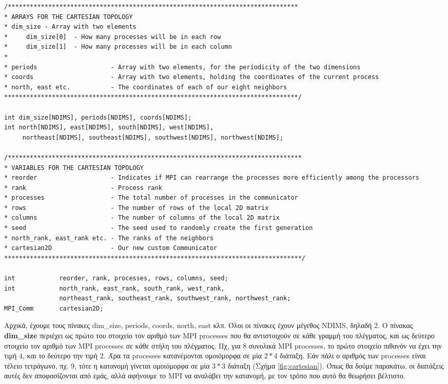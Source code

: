 \begin{tcolorbox}
\begin{verbatim}
/*******************************************************************************
* ARRAYS FOR THE CARTESIAN TOPOLOGY
* dim_size - Array with two elements
*     dim_size[0]  - How many processes will be in each row
*     dim_size[1]  - How many processes will be in each column
*
* periods                    - Array with two elements, for the periodicity of the two dimensions
* coords                     - Array with two elements, holding the coordinates of the current process
* north, east etc.           - The coordinates of each of our eight neighbors
********************************************************************************/

int dim_size[NDIMS], periods[NDIMS], coords[NDIMS];
int north[NDIMS], east[NDIMS], south[NDIMS], west[NDIMS],
     northeast[NDIMS], southeast[NDIMS], southwest[NDIMS], northwest[NDIMS];

/********************************************************************************
* VARIABLES FOR THE CARTESIAN TOPOLOGY
* reorder                    - Indicates if MPI can rearrange the processes more efficiently among the processors
* rank                       - Process rank
* processes                  - The total number of processes in the communicator
* rows                       - The number of rows of the local 2D matrix
* columns                    - The number of columns of the local 2D matrix
* seed                       - The seed used to randomly create the first generation
* north_rank, east_rank etc. - The ranks of the neighbors
* cartesian2D                - Our new custom Communicator
*********************************************************************************/

int            reorder, rank, processes, rows, columns, seed;
int            north_rank, east_rank, south_rank, west_rank,
               northeast_rank, southeast_rank, southwest_rank, northwest_rank;
MPI_Comm       cartesian2D;
\end{verbatim}
\end{tcolorbox}

\begin{multicols}{2}
Αρχικά, έχουμε τους πίνακες dim\_size, periods, coords, north, east κλπ. Όλοι οι πίνακες έχουν μέγεθος NDIMS, δηλαδή $2$. Ο πίνακας \textbf{dim\_size } περιέχει ως πρώτο του στοιχείο τον αριθμό των MPI processes που θα αντιστοιχούν σε κάθε γραμμή του πλέγματος, και ως δεύτερο στοιχείο τον αριθμό των MPI processes σε κάθε στήλη του πλέγματος. Πχ, για $8$ συνολικά MPI processes, το πρώτο στοιχείο πιθανόν να έχει την τιμή $4$, και το δεύτερο την τιμή $2$. Άρα τα processes κατανέμονται ομοιόμορφα σε μία $2*4$ διάταξη. Εάν πάλι ο αριθμός των processes είναι τέλειο τετράγωνο, πχ. $9$, τότε η κατανομή γίνεται ομοιόμορφα σε μία $3*3$ διάταξη (Σχήμα \ref{fig:cartesian}). Όπως θα δούμε παρακάτω, οι διατάξεις αυτές δεν αποφασίζονται από εμάς, αλλά αφήνουμε το MPI να αναλάβει την κατανομή, με τον τρόπο που αυτό θα θεωρήσει βέλτιστο.
\end{multicols}

